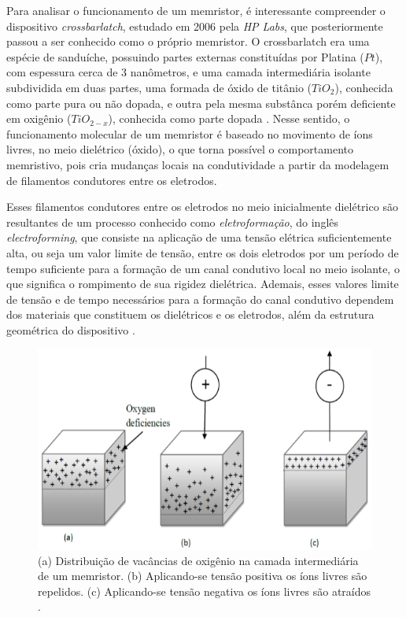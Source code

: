 \documentclass{ceel}
\begin{document}
\begin{multicols}{2}
Para analisar o funcionamento de um memristor, é interessante compreender o dispositivo \emph{crossbarlatch}, estudado em 2006 pela
\emph{HP Labs}, que posteriormente passou a ser conhecido como o próprio memristor. O crossbarlatch era uma espécie de sanduíche, possuindo partes externas constituídas por Platina ($Pt$), com espessura cerca de 3 nanômetros, e uma camada intermediária isolante subdividida em duas partes, uma formada de óxido de titânio ($TiO_2$), conhecida como parte pura ou não dopada, e outra pela mesma substânca porém deficiente em oxigênio ($TiO_{2-x}$), conhecida como parte dopada \cite{construcao}.  Nesse sentido, o funcionamento molecular de um memristor é baseado no movimento de íons livres, no meio dielétrico (óxido), o que torna possível o comportamento memristivo, pois cria mudanças locais na condutividade a partir da modelagem de filamentos condutores entre os eletrodos.

Esses filamentos condutores entre os eletrodos no meio inicialmente dielétrico são resultantes de um processo conhecido como \emph{eletroformação}, do inglês \emph{electroforming}, que consiste na aplicação de uma tensão elétrica suficientemente alta, ou seja um valor limite de tensão, entre os dois eletrodos por um período de tempo suficiente para a formação de um canal condutivo local no meio isolante, o que significa o rompimento de sua rigidez dielétrica.
Ademais, esses valores limite de tensão e de tempo necessários para a formação do canal condutivo dependem dos materiais que constituem os dielétricos e os eletrodos, além da estrutura geométrica do dispositivo \cite{us}. 

\vspace{-0.26cm}
\begin{figure}[H]
\centering
\includegraphics[width=\columnwidth]{oxygen-vacancies}
\caption{(a) Distribuição de vacâncias de oxigênio na camada intermediária de um memristor. (b) Aplicando-se tensão positiva os íons livres são repelidos. (c) Aplicando-se tensão negativa os íons livres são atraídos \cite{study}.}\label{estrutura}
\end{figure}


\end{multicols}
\end{document}
